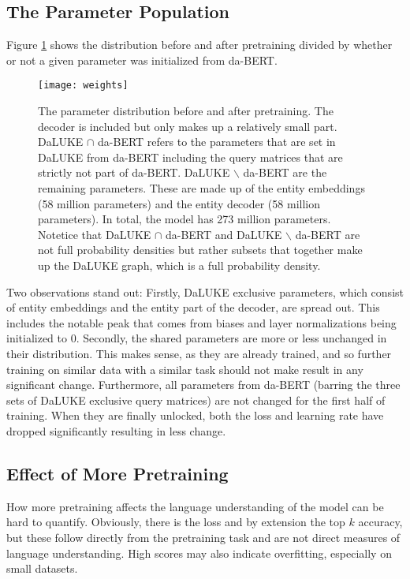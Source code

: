 \documentclass[main.tex]{subfiles}
\begin{document}
\subsection{The Parameter Population}
Figure \ref{fig:weight-dist} shows the distribution before and after pretraining divided by whether or not a given parameter was initialized from da-BERT.
\begin{figure}[H]
    \centering
    \texttt{[image: weights]}
    \caption{
        The parameter distribution before and after pretraining.
        The decoder is included but only makes up a relatively small part.
        DaLUKE $ \cap $ da-BERT refers to the parameters that are set in DaLUKE from da-BERT including the query matrices that are strictly not part of da-BERT.
        DaLUKE $ \backslash $ da-BERT are the remaining parameters.
        These are made up of the entity embeddings (58 million parameters) and the entity decoder (58 million parameters).
        In total, the model has 273 million parameters.
        Notetice that DaLUKE $ \cap $ da-BERT and DaLUKE $ \backslash $ da-BERT are not full probability densities but rather subsets that together make up the DaLUKE graph, which is a full probability density.
    }
    \label{fig:weight-dist}
\end{figure}\noindent
Two observations stand out:
Firstly, DaLUKE exclusive parameters, which consist of entity embeddings and the entity part of the decoder, are spread out.
This includes the notable peak that comes from biases and layer normalizations being initialized to 0.
Secondly, the shared parameters are more or less unchanged in their distribution.
This makes sense, as they are already trained, and so further training on similar data with a similar task should not make result in any significant change.
Furthermore, all parameters from da-BERT (barring the three sets of DaLUKE exclusive query matrices) are not changed for the first half of training.
When they are finally unlocked, both the loss and learning rate have dropped significantly resulting in less change.

\subsection{Effect of More Pretraining}
How more pretraining affects the language understanding of the model can be hard to quantify.
Obviously, there is the loss and by extension the top $ k $ accuracy, but these follow directly from the pretraining task and are not direct measures of language understanding.
High scores may also indicate overfitting, especially on small datasets.
\end{document}
